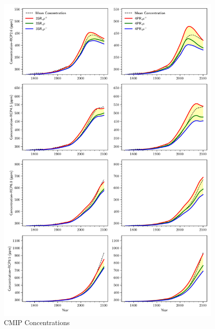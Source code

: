 \documentclass[11pt, a4paper, pdftex, twoside, dvipsnames]{article}
\begin{document}
\begin{figure}
    \centering
    \includegraphics[width=\textwidth]{fig/simulate_cmip_conc.png}
    \caption{CMIP Concentrations}
\end{figure}
\end{document}
